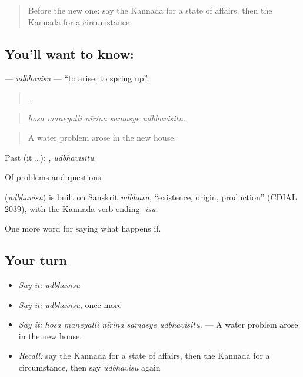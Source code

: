 \label{lesson:KA-C430-udbhavisu}



\begin{quote}
Before the new one: say the Kannada for a state of affairs, then the Kannada for a circumstance.
\end{quote}

\subsection*{You'll want to know: }
\textbf{} — \emph{udbhavisu} — \textquotedblleft{}to arise; to spring up\textquotedblright{}.

\begin{quote}
    .
\end{quote}

\begin{quote}
\emph{hosa maneyalli nīrina samasye udbhavisitu.}
\end{quote}

\begin{quote}
A water problem arose in the new house.
\end{quote}

Past (it …): , \emph{udbhavisitu}.

Of problems and questions.

\begin{cousinweb}
\textbf{} (\emph{udbhavisu}) is built on Sanskrit \emph{udbhava}, \textquotedblleft{}existence, origin, production\textquotedblright{} (CDIAL 2039), with the Kannada verb ending -\emph{isu}.
\end{cousinweb}

\begin{grammarlens}[title={What you've built}]
One more word for saying what happens if.
\end{grammarlens}

\subsection*{Your turn}
\begin{itemize}
\raggedright
  \item \emph{Say it:} \emph{udbhavisu}
  \item \emph{Say it:} \emph{udbhavisu}, once more
  \item \emph{Say it:} \emph{hosa maneyalli nīrina samasye udbhavisitu.} — A water problem arose in the new house.
  \item \emph{Recall:} say the Kannada for a state of affairs, then the Kannada for a circumstance, then say \emph{udbhavisu} again
\end{itemize}


